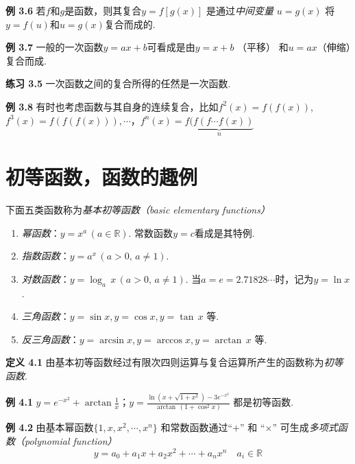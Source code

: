 \documentclass{article}
\begin{document}
\textbf{例 3.6} 若$f$和$g$是函数，则其复合$y=f[g(x)]$ 是通过\textit{中间变量} $u=g(x)$ 将$y=f(u)$和$u=g(x)$复合而成的.

\vspace{3pt}

\textbf{例 3.7} 一般的一次函数$y=ax+b$可看成是由$y=x+b$ （平移） 和$u=ax$（伸缩）复合而成. 

\vspace{3pt}

\textbf{练习 3.5} 一次函数之间的复合所得的任然是一次函数. 

\vspace{3pt}

\textbf{例 3.8} 有时也考虑函数与其自身的连续复合，比如$f^{2}(x)=f(f(x))$,\,$f^{3}(x)=f(f(f(x))),\cdots$，$f^{n}(x)=\underbrace{f(f(f\cdots f(x))}_{n}$


\section{初等函数，函数的趣例}

下面五类函数称为\textit{基本初等函数（basic elementary functions）}
\begin{enumerate}
    \item \textit{幂函数}：$y=x^{a}\,(a\in \mathbb{R})$. 常数函数$y=c$看成是其特例. 
    \item \textit{指数函数}：$y=a^{x}\,(a>0,\,a\neq 1)$.
    \item \textit{对数函数}：$y=\log_{a}\,x\,(a>0,\,a\neq 1)$. 当$a=e=2.71828\cdots$时，记为$y=\ln{x}$.
    \item \textit{三角函数}：$y=\sin{x}$,\,$y=\cos{x}$,\,$y=\tan\,x$ 等.
    \item \textit{反三角函数}：$y=\arcsin{x}$,\,$y=\arccos{x}$,\,$y=\arctan\,x$ 等.
\end{enumerate}

\textbf{定义 4.1} 由基本初等函数经过有限次四则运算与复合运算所产生的函数称为\textit{初等函数}. 

\vspace{4pt}

\textbf{例 4.1} $\displaystyle y=e^{-x^{2}}+\arctan\frac{1}{x}$；$\displaystyle y=\frac{\ln{(x+\sqrt{1+x^{2}})}-3e^{-x^{2}}}{\arctan\,(1+\cos^{2}x)}$ 都是初等函数.

\vspace{4pt}

\textbf{例 4.2} 由基本幂函数$\{1,x,x^{2},\cdots,x^{n}\}$ 和常数函数通过$“+”$ 和 $“\times”$ 可生成\textit{多项式函数（polynomial function）}\[y=a_{0}+a_{1}x+a_{2}x^{2}+\cdots+a_{n}x^{n}\quad a_{i}\in \mathbb{R}\]
\end{document}
